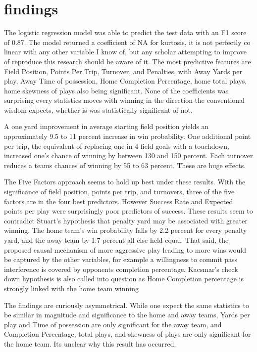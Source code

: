 \documentclass[12pt,english]{article}
\begin{document}
\section{findings}

The logistic regression model was able to predict the test data with an F1 score of 0.87.  The model returned a coefficient of NA for kurtosis, it is not perfectly co linear with any other variable I know of, but any scholar attempting to improve of reproduce this research should be aware of it.  The most predictive features are Field Position, Points Per Trip, Turnover, and Penalties, with Away Yards per play, Away Time of possession, Home Completion Percentage, home total plays, home skewness of plays also being significant.  None of the coefficients was surprising every statistics moves with winning in the direction the conventional wisdom expects, whether is was statistically significant of not.

A one yard improvement in average starting field position yields an approximately 9.5 to 11 percent increase in win probability.  One additional point per trip, the equivalent of replacing one in 4 field goals with a touchdown, increased one's chance of winning by between 130 and 150 percent.  Each turnover reduces a teams chances of winning by 55 to 63 percent.  These are huge effects.  

The Five Factors approach seems to hold up best under these results.  With the significance of field position, points per trip, and turnovers, three of the five factors are in the four best predictors.  However Success Rate and Expected points per play were surprisingly poor predictors of success.  These results seem to contradict Stuart's hypothesis that penalty yard may be associated with greater winning.  The home team's win probability falls by 2.2 percent for every penalty yard, and the away team by 1.7 percent all else held equal.  That said, the proposed causal mechanism of more aggressive play leading to more wins would be captured by the other variables, for example a willingness to commit pass interference is  covered by opponents completion percentage.  Kacsmar's check down hypothesis is also called into question as Home Completion percentage is strongly linked with the home team winning

The findings are curiously asymmetrical.  While one expect the same statistics to be similar in magnitude and significance to the home and away teams, Yards per play and Time of possession are only significant for the away team, and Completion Percentage, total plays, and skewness of plays are only significant for the home team.  Its unclear why this result has occurred.
\end{document}
